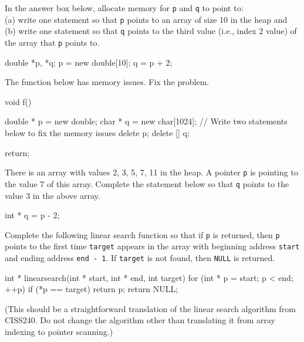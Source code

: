 

\nextq
In the answer box below, allocate memory for \verb!p! and \verb!q! to point to:
\\
(a) write one statement so that \verb!p! points to an array of size 10 in
the heap and
\\
(b) write one statement so that \verb!q! points to the third value
(i.e., index 2 value) of the array that \verb!p! points to.
\\
\ANSWER
\begin{answercode}
double *p, *q;
p = new double[10];
q = p + 2;
\end{answercode}

\nextq
The function below has memory issues. Fix the problem.
\\
\ANSWER
\begin{answercode}
void f()
{
    double * p = new double;
    char * q = new char[1024];
    // Write two statements below to fix the memory issues
    delete p;
    delete [] q;

    return;
}
\end{answercode}

\nextq
There is an array with values 2, 3, 5, 7, 11 in the heap.
A pointer \verb!p! is pointing to the value 7 of this array.
Complete the statement below so that \verb!q! points to the value 3
in the above array.
\\
\ANSWER
\begin{answercode}
int * q = p - 2;
\end{answercode}

\nextq
Complete the following linear search function so that
if \verb!p! is returned, then \verb!p! points to the first time
\verb!target! appears in the array with beginning address
\verb!start! and ending address \verb!end - 1!.
If \verb!target! is not found, then \verb!NULL! is returned.
\\
\ANSWER
\begin{answercode}
int * linearsearch(int * start, int * end, int target)
{
    for (int * p = start; p < end; ++p)
    {
        if (*p == target)
        {
            return p;
        }
    }
    return NULL;
}
\end{answercode}
(This should be a straightforward translation of the linear search
algorithm from CISS240. Do not change the algorithm other than
translating it from array indexing to pointer scanning.)



